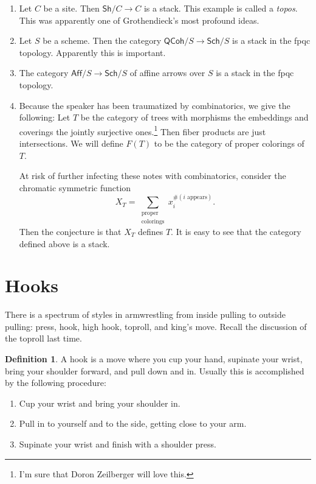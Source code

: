 \documentclass[leqno, openany]{memoir}
\theoremstyle{definition}
\newtheorem{defn}[thm]{Definition}
\theoremstyle{remark}
\theoremstyle{plain}
\theoremstyle{definition}
\theoremstyle{remark}
\newcommand{\ms}[1]{\mathsf{#1}}
\begin{document}
\begin{enumerate} \item Let $C$ be a site. Then $\ms{Sh}/C \to C$ is a stack.
    This example is called a \textit{topos}. This was apparently one of
    Grothendieck's most profound ideas.  \item Let $S$ be a scheme. Then the
    category $\ms{QCoh}/S \to \ms{Sch}/S$ is a stack in the fpqc topology.
    Apparently this is important.  \item The category $\ms{Aff}/S \to
    \ms{Sch}/S$ of affine arrows over $S$ is a stack in the fpqc topology.
\item Because the speaker has been traumatized by combinatorics, we give the
    following: Let $T$ be the category of trees with morphisms the embeddings
    and coverings the jointly surjective ones.\footnote{I'm sure that Doron
    Zeilberger will love this.} Then fiber products are just intersections. We
    will define $F(T)$ to be the category of proper colorings of $T$.

        At risk of further infecting these notes with combinatorics, consider
        the chromatic symmetric function \[ X_T = \sum_{\substack{\text{proper}
        \\ \text{colorings}}} x_i^{\#(i\text{ appears})}. \] Then the
        conjecture is that $X_T$ defines $T$. It is easy to see that the
        category defined above is a stack.  \end{enumerate}

\section{Hooks}%

There is a spectrum of styles in armwrestling from inside pulling to outside
pulling: press, hook, high hook, toproll, and king's move. Recall the
discussion of the toproll last time. 

\begin{defn} A hook is a move where you cup your hand, supinate your wrist,
    bring your shoulder forward, and pull down and in. Usually this is
    accomplished by the following procedure: \begin{enumerate} \item Cup your
        wrist and bring your shoulder in.  \item Pull in to yourself and to the
side, getting close to your arm.  \item Supinate your wrist and finish with a
shoulder press.  \end{enumerate} \end{defn}
\end{document}
